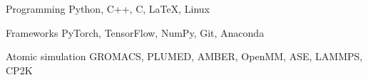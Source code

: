 
\begin{cvskills}

  \cvskill
    {Programming}
    {Python, C++, C, \LaTeX, Linux}

  \cvskill
    {Frameworks}
    {PyTorch, TensorFlow, NumPy, Git, Anaconda}

  \cvskill
    {Atomic simulation}
    {GROMACS, PLUMED, AMBER, OpenMM, ASE, LAMMPS, CP2K}

\end{cvskills}